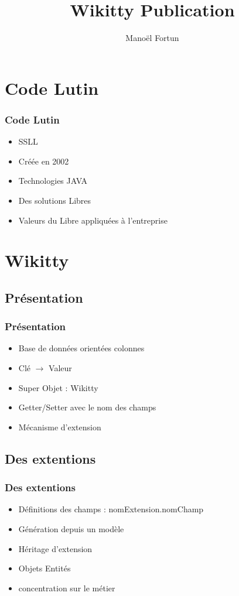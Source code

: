 \documentclass[12pt,a4paper,utf8x]{beamer}
\begin{document}
\title{Wikitty Publication}  
\author{Manoël Fortun}

\begin{frame}
\titlepage
\end{frame}

\begin{frame}\tableofcontents	
\end{frame} 


\section{Code Lutin}

\begin{frame}\frametitle{Code Lutin} 
\begin{itemize}
\item SSLL
\item Créée en 2002
\item Technologies JAVA
\item Des solutions Libres
\item Valeurs du Libre appliquées à l'entreprise
\end{itemize}
\end{frame}



\section{Wikitty} 
\subsection*{Présentation} 
\begin{frame}\frametitle{Présentation} 
\begin{itemize}
\item Base de données orientées colonnes
\item Clé $\to$ Valeur 
\item Super Objet : Wikitty
\item Getter/Setter avec le nom des champs
\item Mécanisme d'extension
\end{itemize}
\end{frame}


\subsection*{Des extentions} 
\begin{frame}\frametitle{Des extentions} 
\begin{itemize}
\item Définitions des champs : nomExtension.nomChamp
\item Génération depuis un modèle
\item Héritage d'extension
\item Objets Entités
\item concentration sur le métier
\end{itemize}
\end{frame}
\end{document}
